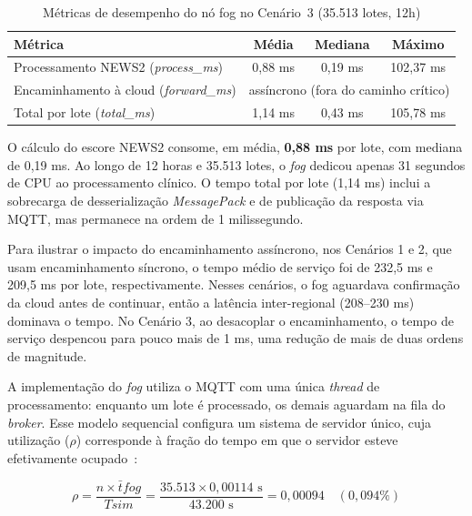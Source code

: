 \documentclass[twoside,english,brazilian]{UNISINOSmonografia}
\begin{document}
\begin{table}[!ht]
\centering
\caption{Métricas de desempenho do nó fog no Cenário~3 (35.513 lotes, 12h)}
\label{tab:fog_metrics}
\footnotesize
\begin{tabular}{|l|c|c|c|}
\hline
\textbf{Métrica} & \textbf{Média} & \textbf{Mediana} & \textbf{Máximo} \\ \hline
Processamento NEWS2 (\textit{process\_ms}) & 0,88 ms & 0,19 ms & 102,37 ms \\ \hline
Encaminhamento à cloud (\textit{forward\_ms}) & \multicolumn{3}{c|}{assíncrono (fora do caminho crítico)} \\ \hline
Total por lote (\textit{total\_ms}) & 1,14 ms & 0,43 ms & 105,78 ms \\ \hline
\end{tabular}
\end{table}

O cálculo do escore NEWS2 consome, em média, \textbf{0,88 ms} por lote, com mediana de 0,19 ms. Ao longo de 12 horas e 35.513 lotes, o \textit{fog} dedicou apenas 31 segundos de CPU ao processamento clínico. O tempo total por lote (1,14 ms) inclui a sobrecarga de desserialização \textit{MessagePack} e de publicação da resposta via MQTT, mas permanece na ordem de 1 milissegundo.

Para ilustrar o impacto do encaminhamento assíncrono, nos Cenários 1 e 2, que usam encaminhamento síncrono, o tempo médio de serviço foi de 232,5 ms e 209,5 ms por lote, respectivamente. Nesses cenários, o fog aguardava confirmação da cloud antes de continuar, então a latência inter-regional (208–230 ms) dominava o tempo. No Cenário 3, ao desacoplar o encaminhamento, o tempo de serviço despencou para pouco mais de 1 ms, uma redução de mais de duas ordens de magnitude.

A implementação do \textit{fog} utiliza o MQTT com uma única \textit{thread} de processamento: enquanto um lote é processado, os demais aguardam na fila do \textit{broker}. Esse modelo sequencial configura um sistema de servidor único, cuja utilização ($\rho$) corresponde à fração do tempo em que o servidor esteve efetivamente ocupado~\cite{Kleinrock1975}:

\begin{equation}
\rho = \frac{n \times \bar{t}{fog}}{T{sim}} = \frac{35.513 \times 0{,}00114\text{ s}}{43.200\text{ s}} = 0{,}00094 \quad (0{,}094\%)
\label{eq:rho}
\end{equation}
\end{document}

